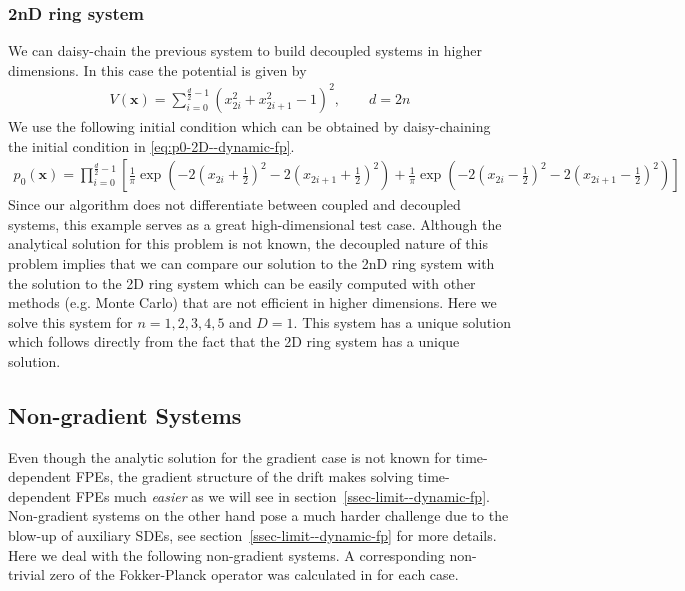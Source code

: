 \subsubsection{2nD ring system}\label{ssec-2nD--dynamic-fp} We can daisy-chain the previous system to build decoupled systems in higher dimensions. In this case the potential is given by
\begin{align}
    V(\mathbf x)=\sum_{i=0}^{\frac{d}{2}-1}(x_{2i}^2+x_{2i+1}^2-1)^2,\qquad d=2n\label{eq:potential-2nD--dynamic-fp}
\end{align}
We use the following initial condition which can be obtained by daisy-chaining the initial condition in \eqref{eq:p0-2D--dynamic-fp}.
\begin{align}
    p_0(\mathbf x) = \prod_{i=0}^{\frac{d}{2}-1
    }\left[\frac{1}{\pi}\exp\left(-2\left(x_{2i}+\frac{1}{2}\right)^2-2\left(x_{2i+1}+\frac{1}{2}\right)^2\right)+\frac{1}{\pi}\exp\left(-2\left(x_{2i}-\frac{1}{2}\right)^2-2\left(x_{2i+1}-\frac{1}{2}\right)^2\right)\right]\label{eq:p0-2nD--dynamic-fp}
\end{align}
Since our algorithm does not differentiate between coupled and decoupled systems, this example serves as a great high-dimensional test case.  Although the analytical solution for this problem is not known, the decoupled nature of this problem implies that we can compare our solution to the 2nD ring system with the solution to the 2D ring system which can be easily computed with other methods (e.g. Monte Carlo) that are not efficient in higher dimensions. Here we solve this system for $n=1,2,3,4,5$ and $D=1$. This system has a unique solution which follows directly from the fact that the 2D ring system has a unique solution.
\subsection{Non-gradient Systems}
Even though the analytic solution for the gradient case is not known for time-dependent FPEs, the gradient structure of the drift makes solving time-dependent FPEs much \textit{easier} as we will see in section~\ref{ssec-limit--dynamic-fp}. Non-gradient systems on the other hand pose a much harder challenge due to the blow-up of auxiliary SDEs, see section~\ref{ssec-limit--dynamic-fp} for more details. Here we deal with the following non-gradient systems. A corresponding non-trivial zero of the Fokker-Planck operator was calculated in \cite{mandal2023learning} for each case.
